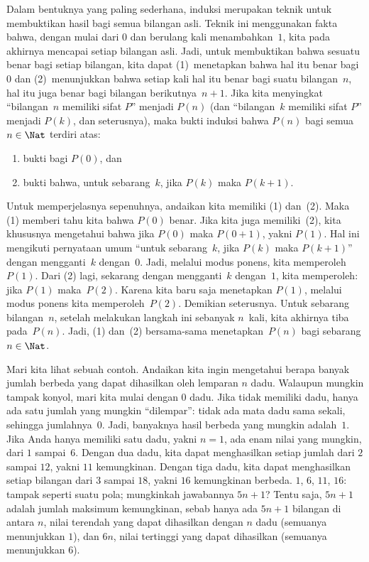 \documentclass[../../../include/open-logic-section]{subfiles}
\begin{document}


Dalam bentuknya yang paling sederhana, induksi merupakan teknik untuk
membuktikan hasil bagi semua bilangan asli. Teknik ini menggunakan fakta
bahwa, dengan mulai dari $0$ dan berulang kali menambahkan~$1$, kita pada
akhirnya mencapai setiap bilangan asli. Jadi, untuk membuktikan bahwa
sesuatu benar bagi setiap bilangan, kita dapat (1)~menetapkan bahwa hal itu
benar bagi $0$ dan (2)~menunjukkan bahwa setiap kali hal itu benar bagi suatu
bilangan~$n$, hal itu juga benar bagi bilangan berikutnya~$n+1$. Jika kita
menyingkat ``bilangan~$n$ memiliki sifat $P$'' menjadi $P(n)$ (dan
``bilangan~$k$ memiliki sifat $P$'' menjadi $P(k)$, dan seterusnya), maka
bukti induksi bahwa $P(n)$ bagi semua $n \in \Nat$ terdiri atas:
\begin{enumerate}
\item bukti bagi $P(0)$, dan
\item bukti bahwa, untuk sebarang~$k$, jika $P(k)$ maka $P(k+1)$.
\end{enumerate}
Untuk memperjelasnya sepenuhnya, andaikan kita memiliki (1) dan~(2). Maka
(1) memberi tahu kita bahwa $P(0)$ benar. Jika kita juga memiliki~(2), kita
khususnya mengetahui bahwa jika $P(0)$ maka $P(0+1)$, yakni $P(1)$. Hal ini
mengikuti pernyataan umum ``untuk sebarang~$k$, jika $P(k)$ maka $P(k+1)$''
dengan mengganti~$k$ dengan~$0$. Jadi, melalui modus ponens, kita memperoleh
$P(1)$. Dari (2) lagi, sekarang dengan mengganti~$k$ dengan~$1$, kita
memperoleh: jika $P(1)$ maka~$P(2)$. Karena kita baru saja menetapkan
$P(1)$, melalui modus ponens kita memperoleh~$P(2)$. Demikian seterusnya.
Untuk sebarang bilangan~$n$, setelah melakukan langkah ini sebanyak
$n$~kali, kita akhirnya tiba pada~$P(n)$. Jadi, (1) dan~(2) bersama-sama
menetapkan~$P(n)$ bagi sebarang $n \in \Nat$.

Mari kita lihat sebuah contoh. Andaikan kita ingin mengetahui berapa banyak
jumlah berbeda yang dapat dihasilkan oleh lemparan $n$ dadu. Walaupun
mungkin tampak konyol, mari kita mulai dengan $0$ dadu. Jika tidak memiliki
dadu, hanya ada satu jumlah yang mungkin ``dilempar'': tidak ada mata dadu
sama sekali, sehingga jumlahnya~$0$. Jadi, banyaknya hasil berbeda yang
mungkin adalah~$1$. Jika Anda hanya memiliki satu dadu, yakni $n=1$, ada
enam nilai yang mungkin, dari $1$ sampai~$6$. Dengan dua dadu, kita dapat
menghasilkan setiap jumlah dari $2$ sampai $12$, yakni $11$ kemungkinan.
Dengan tiga dadu, kita dapat menghasilkan setiap bilangan dari $3$ sampai
$18$, yakni $16$ kemungkinan berbeda. $1$, $6$, $11$, $16$: tampak seperti
suatu pola; mungkinkah jawabannya $5n+1$? Tentu saja, $5n+1$ adalah jumlah
maksimum kemungkinan, sebab hanya ada $5n+1$ bilangan di antara $n$, nilai
terendah yang dapat dihasilkan dengan $n$ dadu (semuanya menunjukkan $1$),
dan $6n$, nilai tertinggi yang dapat dihasilkan (semuanya menunjukkan $6$).
\end{document}
